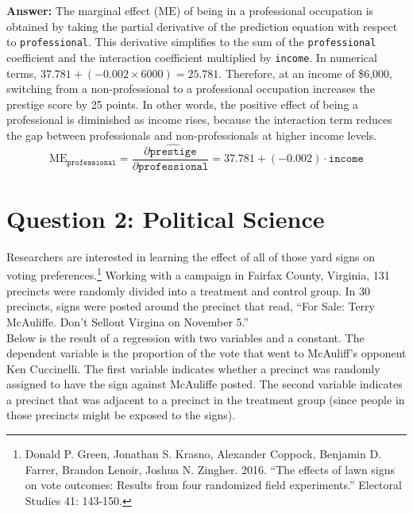 \documentclass[12pt,letterpaper]{article}
\begin{document}
\begin{enumerate}
	\textbf{Answer:}  
	The marginal effect ($\text{ME}$) of being in a professional occupation is obtained by taking the partial derivative of the prediction equation with respect to \texttt{professional}. This derivative simplifies to the sum of the \texttt{professional} coefficient and the interaction coefficient multiplied by \texttt{income}. In numerical terms, $37.781 + (-0.002 \times 6000) = 25.781$. Therefore, at an income of \$6{,}000, switching from a non-professional to a professional occupation increases the prestige score by 25 points. In other words, the positive effect of being a professional is diminished as income rises, because the interaction term reduces the gap between professionals and non-professionals at higher income levels.	
	\[
	\text{ME}_{\texttt{professional}} = \frac{\partial \widehat{\texttt{prestige}}}{\partial \texttt{professional}} = 37.781 + (-0.002) \cdot \texttt{income}
	\]
	
\end{enumerate}

\newpage

\section*{Question 2: Political Science}
\vspace{.25cm}
\noindent 	Researchers are interested in learning the effect of all of those yard signs on voting preferences.\footnote{Donald P. Green, Jonathan	S. Krasno, Alexander Coppock, Benjamin D. Farrer,	Brandon Lenoir, Joshua N. Zingher. 2016. ``The effects of lawn signs on vote outcomes: Results from four randomized field experiments.'' Electoral Studies 41: 143-150. } Working with a campaign in Fairfax County, Virginia, 131 precincts were randomly divided into a treatment and control group. In 30 precincts, signs were posted around the precinct that read, ``For Sale: Terry McAuliffe. Don't Sellout Virgina on November 5.'' \\

Below is the result of a regression with two variables and a constant.  The dependent variable is the proportion of the vote that went to McAuliff's opponent Ken Cuccinelli. The first variable indicates whether a precinct was randomly assigned to have the sign against McAuliffe posted. The second variable indicates
a precinct that was adjacent to a precinct in the treatment group (since people in those precincts might be exposed to the signs).  \\
\end{document}
